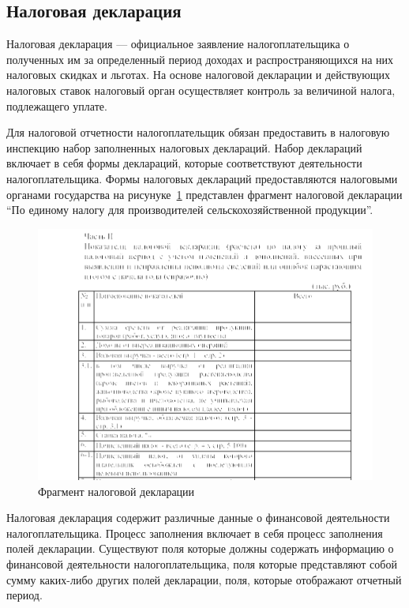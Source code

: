 \documentclass[14pt,a4paper]{reportmod}
\begin{document}
\subsection{Налоговая декларация}
Налоговая декларация — официальное заявление налогоплательщика о полученных им за определенный период доходах и распространяющихся на них налоговых скидках и льготах. На основе налоговой декларации и действующих налоговых ставок налоговый орган осуществляет контроль за величиной налога, подлежащего уплате.\cite{refwikitaxreturn}

Для налоговой отчетности налогоплательщик обязан предоставить в налоговую инспекцию набор заполненных налоговых деклараций. Набор деклараций включает в себя формы деклараций, которые соответствуют деятельности налогоплательщика. Формы налоговых деклараций предоставляются налоговыми органами государства на рисунуке~\ref{pic:taxformrb} представлен фрагмент налоговой декларации ``По единому налогу для производителей сельскохозяйственной продукции''.

\begin{figure}
  \centering
  \includegraphics[scale=0.4]{pics/taxformrb}
  \caption{Фрагмент налоговой декларации}
  \label{pic:taxformrb}
\end{figure}


Налоговая декларация содержит различные данные о финансовой деятельности налогоплательщика. Процесс заполнения включает в себя процесс заполнения полей декларации. Существуют поля которые должны содержать информацию о финансовой деятельности налогоплательщика, поля которые представляют собой сумму каких-либо других полей декларации, поля, которые отображают отчетный период.
\end{document}

